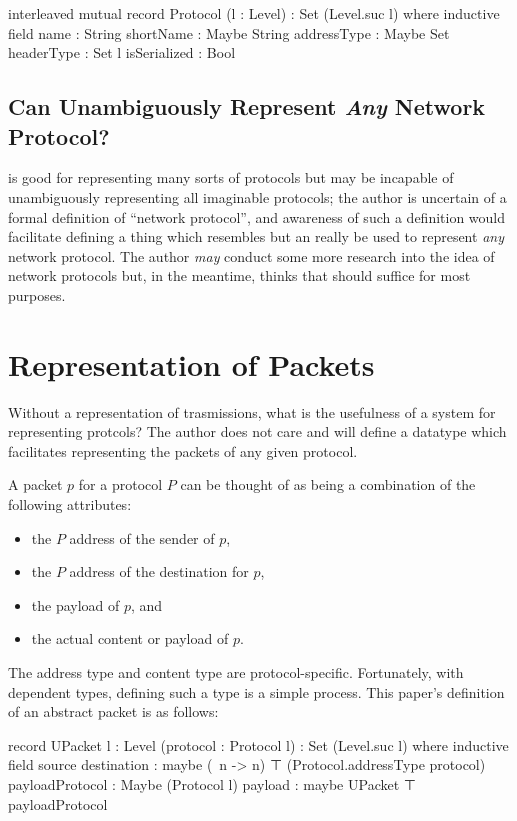 \documentclass{report}
\begin{document}
\begin{code}
  interleaved mutual
    record Protocol (l : Level) : Set (Level.suc l) where
      inductive
      field
        name : String
        shortName : Maybe String
        addressType : Maybe Set
        headerType : Set l
        isSerialized : Bool
\end{code}

\section{Can  Unambiguously Represent \emph{Any} Network Protocol?}
 is good for representing many sorts of protocols but may be incapable of unambiguously representing all imaginable protocols; the author is uncertain of a formal definition of ``network protocol'', and awareness of such a definition would facilitate defining a thing which resembles  but an really be used to represent \emph{any} network protocol.  The author \emph{may} conduct some more research into the idea of network protocols but, in the meantime, thinks that  should suffice for most purposes.

\chapter{Representation of Packets}
Without a representation of trasmissions, what is the usefulness of a system for representing protcols?  The author does not care and will define a datatype which facilitates representing the packets of any given protocol.

A packet \(p\) for a protocol \(P\) can be thought of as being a combination of the following attributes:
\begin{itemize}
  \item the \(P\) address of the sender of \(p\),
  \item the \(P\) address of the destination for \(p\),
  \item the payload of \(p\), and
  \item the actual content or payload of \(p\).
\end{itemize}

The address type and content type are protocol-specific.  Fortunately, with dependent types, defining such a type is a simple process.  This paper's definition of an abstract packet is as follows:

\begin{code}
    record UPacket {l : Level} (protocol : Protocol l) : Set (Level.suc l) where
      inductive
      field
        source
         destination : maybe (\ n -> n) ⊤ (Protocol.addressType protocol)
        payloadProtocol : Maybe (Protocol l)
        payload : maybe UPacket ⊤ payloadProtocol
\end{code}
\end{document}
